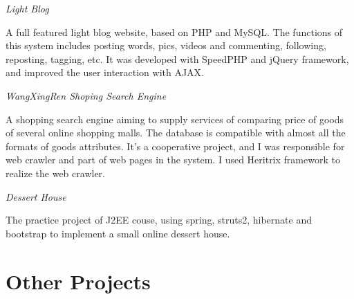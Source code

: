 \documentclass[10pt]{article} %
\begin{document}
{\begin{minipage}[t]{0.52\textwidth}
{\raggedright\large \textit{Light Blog}\\[5pt]}

\normalsize{A full featured light blog website, based on PHP and MySQL. The functions of this system includes posting words, pics, videos and commenting, following, reposting, tagging, etc. It was developed with SpeedPHP and jQuery framework, and improved the user interaction with AJAX. }\\


{\par}

{\raggedright\large \textit{WangXingRen Shoping Search Engine}\\[5pt]}

\normalsize{A shopping search engine aiming to supply services of comparing price of goods of several online shopping malls. The database is compatible with almost all the formats of goods attributes. It's a cooperative project, and I was responsible for web crawler and part of web pages in the system. I used Heritrix framework to realize the web crawler. }\\


{\par}

{\raggedright\large \textit{Dessert House}\\[5pt]}

\normalsize{The practice project of J2EE couse, using spring, struts2, hibernate and bootstrap to implement a small online dessert house.}\\



\section{Other Projects} 


\end{minipage}}
\end{document}
